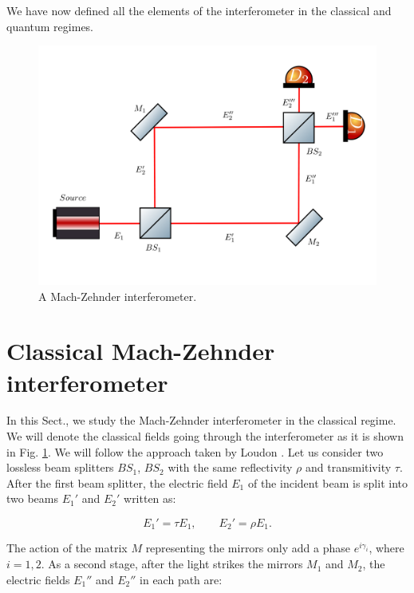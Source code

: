 \documentclass[12pt]{book}
\begin{document}
 We have now defined all the elements of the interferometer in the classical and quantum regimes.

\begin{figure}[H]
\centering
\includegraphics[width=\linewidth]{images/machzenhdercla.png}
\caption{A Mach-Zehnder interferometer.}
\label{fig:classical mach}
\end{figure}



\section{Classical Mach-Zehnder interferometer}

In this Sect., we study the Mach-Zehnder interferometer in the classical regime. We will denote the classical fields going through the interferometer as it is shown in Fig. \ref{fig:classical mach}. We will follow the approach taken by Loudon \cite{ludon}. Let us consider two lossless beam splitters   $BS_{1}$, $BS_{2}$ with the same reflectivity $\rho$ and transmitivity $\tau$. After the first beam splitter, the electric field $E_{1}$ of the incident beam is split into two beams $E_{1}'$ and $E_{2}'$ written as:

\begin{equation}
E_{1}'=\tau E_{1} ,\qquad E_{2}'=\rho E_{1}.\label{corr1}
\end{equation}

The action of the matrix $M$ representing the mirrors only add a phase $e^{i\gamma_{i}}$, where $i=1,2$. As a second stage, after the light strikes the mirrors $M_{1}$ and $M_{2}$, the electric fields $E_{1}''$ and $E_{2}''$ in each path are:
\end{document}
